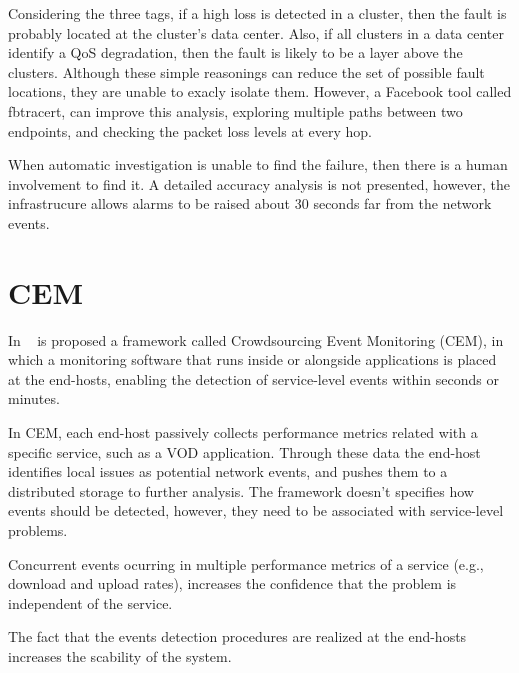 Considering the three tags, if a high loss is detected in a cluster,
then the fault is probably located at the cluster's data center.
Also, if all clusters in a data center identify a QoS degradation,
then the fault is likely to be a layer above the clusters.
Although these simple reasonings can reduce the set of possible fault locations,
they are unable to exacly isolate them.
However, a Facebook tool called fbtracert,
can improve this analysis, exploring multiple
paths between two endpoints, and checking the
packet loss levels at every hop.

When automatic investigation is unable to find the failure, then there
is a human involvement to find it. A detailed accuracy analysis is not
presented, however, the infrastrucure allows alarms to be raised about 30
seconds far from the network events.

\section{CEM}

In ~\cite{crowdsourcing_service_level_network_event_monitoring} is proposed a
framework called Crowdsourcing Event Monitoring (CEM), in which a
monitoring software that runs inside or alongside applications is placed at the
end-hosts, enabling the detection of service-level events within seconds or
minutes.

In CEM, each end-host passively collects performance metrics related with a
specific service, such as a VOD application.
Through these data the end-host identifies local issues as
potential network events, and pushes them to a distributed storage to further
analysis.
The framework doesn't specifies how events should be detected,
however, they need to be associated with service-level problems.

Concurrent events ocurring in multiple
performance metrics of a service (e.g., download and upload rates), increases the
confidence that the problem is independent of the service.

The
fact that the events detection procedures are realized at the end-hosts
increases the scability of the system.

